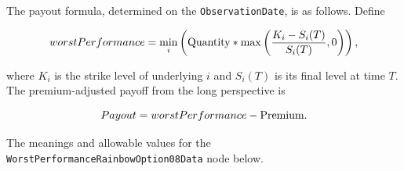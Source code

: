 The payout formula, determined on the \lstinline!ObservationDate!, is as follows.
Define

\begin{equation*}
  worstPerformance = \min_i \left( \text{\lstinline!Quantity!} * \max\left(\frac{K_i - S_i(T)}{S_i(T)}, 0\right) \right),
\end{equation*}

where $K_i$ is the strike level of underlying $i$ and $S_i(T)$ is its final level at time $T$.
The premium-adjusted payoff from the long perspective is

\begin{equation*}
  Payout = worstPerformance - \text{\lstinline!Premium!}.
\end{equation*}

The meanings and allowable values for the \lstinline!WorstPerformanceRainbowOption08Data! node below.

